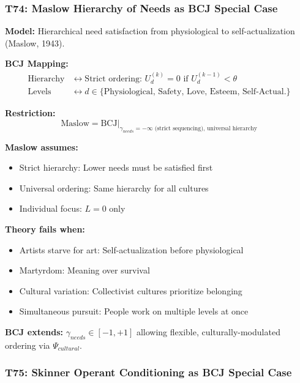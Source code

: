 \subsubsection*{T74: Maslow Hierarchy of Needs as BCJ Special Case}

\textbf{Model:} Hierarchical need satisfaction from physiological to self-actualization (Maslow, 1943).

\textbf{BCJ Mapping:}
\begin{align}
\text{Hierarchy} &\leftrightarrow \text{Strict ordering: } U_d^{(k)} = 0 \text{ if } U_d^{(k-1)} < \theta \\
\text{Levels} &\leftrightarrow d \in \{\text{Physiological, Safety, Love, Esteem, Self-Actual.}\}
\end{align}

\textbf{Restriction:}
\begin{equation}
\text{Maslow} = \text{BCJ} \big|_{\gamma_{needs} = -\infty \text{ (strict sequencing)}, \, \text{universal hierarchy}}
\end{equation}

\begin{tcolorbox}[colback=red!5!white, colframe=red!75!black,
    title=Boundary Condition: Where Maslow Fails]
\textbf{Maslow assumes:}
\begin{itemize}[nosep]
\item Strict hierarchy: Lower needs must be satisfied first
\item Universal ordering: Same hierarchy for all cultures
\item Individual focus: $L = 0$ only
\end{itemize}

\textbf{Theory fails when:}
\begin{itemize}[nosep]
\item Artists starve for art: Self-actualization before physiological
\item Martyrdom: Meaning over survival
\item Cultural variation: Collectivist cultures prioritize belonging
\item Simultaneous pursuit: People work on multiple levels at once
\end{itemize}

\textbf{BCJ extends:} $\gamma_{needs} \in [-1, +1]$ allowing flexible, culturally-modulated ordering via $\Psi_{cultural}$.
\end{tcolorbox}

\subsubsection*{T75: Skinner Operant Conditioning as BCJ Special Case}


